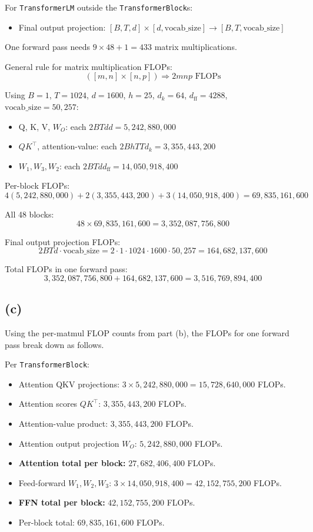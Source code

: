 \documentclass[11pt]{article}
\begin{document}
For \texttt{TransformerLM} outside the \texttt{TransformerBlock}s:
\begin{itemize}
    \item Final output projection: \([B,T,d]\times[d,\text{vocab\_size}]\to[B,T,\text{vocab\_size}]\)
\end{itemize}

One forward pass needs \(9\times48+1=433\) matrix multiplications.

General rule for matrix multiplication FLOPs:
\[
([m,n]\times[n,p]) \Rightarrow 2mnp \text{ FLOPs}
\]

Using \(B=1\), \(T=1024\), \(d=1600\), \(h=25\), \(d_k=64\), \(d_{\text{ff}}=4288\), \(\text{vocab\_size}=50{,}257\):
\begin{itemize}
    \item Q, K, V, \(W_O\): each \(2BTdd=5{,}242{,}880{,}000\)
    \item \(QK^\top\), attention-value: each \(2BhTTd_k=3{,}355{,}443{,}200\)
    \item \(W_1, W_3, W_2\): each \(2BTdd_{\text{ff}}=14{,}050{,}918{,}400\)
\end{itemize}

Per-block FLOPs:
\[
4(5{,}242{,}880{,}000) + 2(3{,}355{,}443{,}200) + 3(14{,}050{,}918{,}400)
= 69{,}835{,}161{,}600
\]

All 48 blocks:
\[
48\times69{,}835{,}161{,}600
= 3{,}352{,}087{,}756{,}800
\]

Final output projection FLOPs:
\[
2BTd\cdot\text{vocab\_size}
= 2\cdot1\cdot1024\cdot1600\cdot50{,}257
= 164{,}682{,}137{,}600
\]

Total FLOPs in one forward pass:
\[
3{,}352{,}087{,}756{,}800 + 164{,}682{,}137{,}600
= \boxed{3{,}516{,}769{,}894{,}400}
\]

\subsection*{(c)}
Using the per-matmul FLOP counts from part (b), the FLOPs for one forward pass break down as follows.

Per \texttt{TransformerBlock}:
\begin{itemize}
    \item Attention QKV projections: $3 \times 5{,}242{,}880{,}000 = 15{,}728{,}640{,}000$ FLOPs.
    \item Attention scores $QK^\top$: $3{,}355{,}443{,}200$ FLOPs.
    \item Attention-value product: $3{,}355{,}443{,}200$ FLOPs.
    \item Attention output projection $W_O$: $5{,}242{,}880{,}000$ FLOPs.
    \item \textbf{Attention total per block:} $27{,}682{,}406{,}400$ FLOPs.
    \item Feed-forward $W_1, W_2, W_3$: $3 \times 14{,}050{,}918{,}400 = 42{,}152{,}755{,}200$ FLOPs.
    \item \textbf{FFN total per block:} $42{,}152{,}755{,}200$ FLOPs.
    \item Per-block total: $69{,}835{,}161{,}600$ FLOPs.
\end{itemize}
\end{document}

